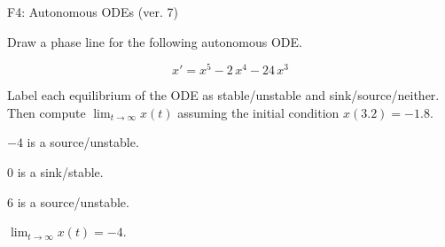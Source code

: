 \begin{exercise}
  \begin{exerciseTitle}F4: Autonomous ODEs (ver. 7)\end{exerciseTitle}
  \begin{exerciseStatement}
    

      Draw a phase line for the following 
      autonomous ODE.
    

    
\[x'= x^{5} - 2 \, x^{4} - 24 \, x^{3}\]

    

      Label each equilibrium of the ODE
      as stable/unstable and sink/source/neither.
      Then compute \(\lim_{t\to\infty}x(t)\)
      assuming the initial condition
      \(x( 3.2 )= -1.8\).
    

  \end{exerciseStatement}
  \begin{exerciseAnswer}
    

      \(-4\) is a source/unstable.
      
        \(0\) is a sink/stable.
      
      \(6\) is a source/unstable.
    

    

      \(\lim_{t\to\infty}x(t)=-4\).
    

  \end{exerciseAnswer}
\end{exercise}